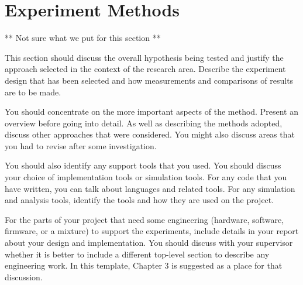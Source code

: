 \chapter{Experiment Methods}

** Not sure what we put for this section **

This section should discuss the overall hypothesis being tested and justify the approach selected in the context of the research area.  Describe the experiment design that has been selected and how measurements and comparisons of results are to be made. 

You should concentrate on the more important aspects of the method. Present an overview before going into detail. As well as describing the methods adopted, discuss other approaches that were considered. You might also discuss areas that you had to revise after some investigation. 

You should also identify any support tools that you used. You should discuss your choice of implementation tools or simulation tools. For any code that you have written, you can talk about languages and related tools. For any simulation and analysis tools, identify the tools and how they are used on the project. 

For the parts of your project that need some engineering (hardware, software, firmware, or a mixture) to support the experiments, include details in your report about your design and implementation. You should discuss with your supervisor whether it is better to include a different top-level section to describe any engineering work.  In this template, Chapter 3 is suggested as a place for that discussion.
